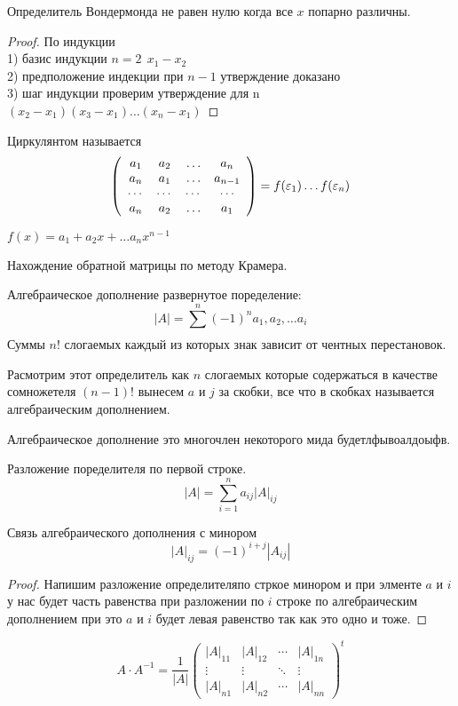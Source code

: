   Определитель Вондермонда не равен нулю когда все $x$ попарно различны.
\begin{proof}
  По индукции\\
  1) базис индукции $n = 2 ~~ x_1 - x_2$\\
  2) предположение индекции при $n-1$ утверждение доказано\\
  3) шаг индукции проверим утверждение для n\\
  $(x_2 - x_1)(x_3 - x_1) \ldots (x_n - x_1)$
\end{proof}

  Циркулянтом называется
\begin{displaymath}
  \left( \begin{array}{cccc}
    a_1 & a_2 & \ldots & a_{n} \\
    a_n & a_1 & \ldots & a_{n-1} \\
    \cdots & \cdots & \cdots & \cdots\\
    a_n & a_2 & \ldots & a_1
  \end{array}\right)
  = f(\varepsilon_1) \ldots f(\varepsilon_n)\\
\end{displaymath}

  $f(x) = a_1 +a_2x + \ldots a_n x^{n-1}$

\begin{title}
  Нахождение обратной матрицы по методу Крамера.
\end{title}
  Алгебраическое дополнение развернутое поределение:
$$
|A| = \sum_{}^n (-1)^{n} a_1, a_2, \ldots a_i
$$
Суммы $n!$ слогаемых каждый из которых знак зависит от чентных перестановок.

  Расмотрим этот определитель как $n$ слогаемых которые содержаться в качестве
сомножетеля $(n-1)!$ вынесем $a$ и $j$ за скобки, все что в скобках называется
алгебраическим дополнением.

  Алгебраическое дополнение это многочлен некоторого мида будетлфывоалдоыфв.

  Разложение поределителя по первой строке.
$$
|A| = \sum_{i=1}^n a_{ij} |A|_{ij}
$$

  Связь алгебраического дополнения с минором
$$
|A|_{ij} = (-1)^{i+j} |A_{ij}|
$$

\begin{proof}
  Напишим разложение определителяпо стркое минором и при элменте $a$ и $i$ у нас
  будет часть равенства при разложении по $i$ строке по алгебраическим
  дополнением при это $a$ и $i$ будет левая равенство так как это одно и тоже.
\end{proof}


\begin{displaymath}
A \cdot A^{-1} = \frac{1}{|A|}\left(\begin{array}{lccr}
|A|_{11} & |A|_{12} & \cdots & |A|_{1n}\\
\vdots & \vdots & \ddots & \vdots \\
|A|_{n1} & |A|_{n2} & \cdots & |A|_{nn}
\end{array}\right)^t
\end{displaymath}